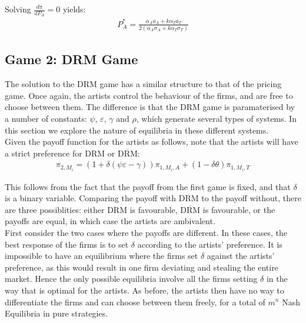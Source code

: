 \documentclass[letter,12pt]{article}
\numberwithin{equation}{section}
\newcommand{\drm}{\text{DRM}}
\newcommand{\nodrm}{\overline{\drm}}
\newcommand{\artistpayoff}[2]{\pi_{#1, M_{#2}}}
\newcommand{\artistalbum}[2]{\pi_{#1, M_{#2}, A}}
\newcommand{\artistticket}[2]{\pi_{#1, M_{#2}, T}}
\newcommand{\deriv}[2]{\frac{d #1}{d #2}}
\begin{document}
Solving $\deriv{\pi}{P_A} = 0$ yields:
\begin{eqnarray}
P_A^* = \frac{\alpha_A a_A + k \alpha_T a_T}{2(\alpha_A \sigma_A + k \alpha_T \sigma_T)}
\end{eqnarray}

\subsection{Game 2: DRM Game}

The solution to the DRM game has a similar structure to that of the pricing game. Once again, the artists control the behaviour of the firms, and are free to choose between them. The difference is that the DRM game is paramaterised by a number of constants: $\psi$, $\varepsilon$, $\gamma$ and $\rho$, which generate several types of systems. In this section we explore the nature of equilibria in these different systems.\\

Given the payoff function for the artists as follows, note that the artists will have a strict preference for DRM or $\overline{\text{DRM}}$:
\begin{eqnarray*}
\artistpayoff{2}{i} = (1 + \delta (\psi \varepsilon - \gamma)) \artistalbum{1}{i} + (1 - \delta \theta) \artistticket{1}{i}
\end{eqnarray*}

This follows from the fact that the payoff from the first game is fixed, and that $\delta$ is a binary variable. Comparing the payoff with DRM to the payoff without, there are three possiblities: either DRM is favourable, $\nodrm$ is favourable, or the payoffs are equal, in which case the artists are ambivalent.\\

First consider the two cases where the payoffs are different. In these cases, the best response of the firms is to set $\delta$ according to the artists' preference. It is impossible to have an equilibrium where the firms set $\delta$ against the artists' preference, as this would result in one firm deviating and stealing the entire market. Hence the only possible equilibria involve all the firms setting $\delta$ in the way that is optimal for the artists. As before, the artists then have no way to differentiate the firms and can choose between them freely, for a total of $m^n$ Nash Equilibria in pure strategies.\\
\end{document}
